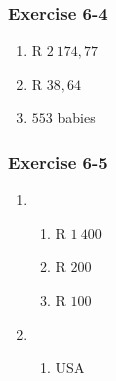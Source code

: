 {\begin{multicols}{3}
\subsubsection*{Exercise 6-4} %

    \begin{enumerate}[label=\textbf{\arabic*}.]
	\item R $2~ 174,77$%

	\item R $38,64$%

	\item $553$ babies%
    \end{enumerate}


\subsubsection*{Exercise 6-5} %

    \begin{enumerate}[noitemsep, label=\textbf{\arabic*}.]
	\item %
	\begin{enumerate}[noitemsep, label=\textbf{(\alph*)} ]
	    \item R $1~ 400$%
	    \item R $200$%
	    \item R $100$%
	\end{enumerate}

	\item %
	
	\begin{enumerate}[noitemsep, label=\textbf{(\alph*)} ]
	    \item USA %


\end{enumerate}
\end{enumerate}
\end{multicols}}

